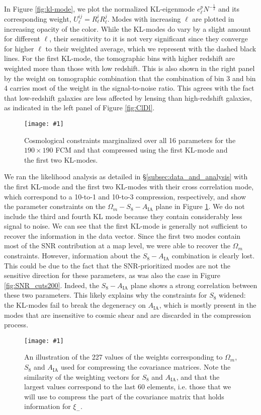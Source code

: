 \documentclass[aps, prd, twocolumn, superscriptaddress, nofootinbib, amssymb, amsmath]{revtex4-2}
\newcommand{\sfig}[2]{
	\texttt{[image: \#1]}
}
\newcommand{\Sfig}[3]{
	\begin{figure}[#1]
		\sfig{../figures/#2.pdf}{\columnwidth}
		\caption{#3}
		\label{fig:#2}
	\end{figure}
}
\newcommand{\Swide}[3]{
	\begin{figure*}[#1]
		\sfig{../figures/#2.pdf}{\textwidth}
		\caption{#3}
		\label{fig:#2}
	\end{figure*}
}
\newcommand{\rf}[1]{Figure \ref{fig:#1}}
\newcommand{\rssec}[1]{\S\ref{subsec:#1}}
\begin{document}
In \rf{kl-mode}, we plot the normalized KL-eigenmode $e^p_{\ell} N^{-\frac{1}{2}}$ and its corresponding weight, $U^{ij}_\ell=R_\ell^i R_\ell^j$. Modes with increasing $\ell$ are plotted in increasing opacity of the color. While the KL-modes do vary by a slight amount for different $\ell$, their sensitivity to it is not very significant since they converge for higher $\ell$ to their weighted average, which we represent with the dashed black lines. For the first KL-mode, the tomographic bins with higher redshift are weighted more than those with low redshift. This is also shown in the right panel by the weight on tomographic combination that the combination of bin 3 and bin 4 carries most of the weight in the signal-to-noise ratio. This agrees with the fact that low-redshift galaxies are less affected by lensing than high-redshift galaxies, as indicated in the left panel of \rf{ClDl}.

\Sfig{b}{CompKL-constraints_wmS8A}{Cosmological constraints marginalized over all 16 parameters for the  $190 \times 190$ FCM and that compressed using the first KL-mode and the first two KL-modes.}

We ran the likelihood analysis as detailed in \rssec{data_and_analysis} with the first KL-mode and the first two KL-modes with their cross correlation mode, which correspond to a 10-to-1 and 10-to-3 compression, respectively, and show the parameter constraints on the $\Omega_m - S_8 - A_{\text{IA}}$ plane in \rf{CompKL-constraints_wmS8A}. We do not include the third and fourth KL mode because they contain considerably less signal to noise. We can see that the first KL-mode is generally not sufficient to recover the information in the data vector. Since the first two modes contain most of the SNR contribution at a map level, we were able to recover the $\Omega_m$ constraints. However, information about the $S_8-A_{\text{IA}}$ combination is clearly lost. This could be due to the fact that the SNR-prioritized modes are not the sensitive direction for these parameters, as was also the case in \rf{SNR_cuts200}. Indeed, the $S_8 - A_{\text{IA}}$ plane shows a strong correlation between these two parameters. This likely explains why the constraints for $S_8$ widened: the KL-modes fail to break the degeneracy on $A_{\text{IA}}$, which is mostly present in the modes that are insensitive to cosmic shear and are discarded in the compression process.

\Swide{tbp}{Weights_2pt}{An illustration of the 227 values of the weights corresponding to $\Omega_m$, $S_8$ and $A_{\text{IA}}$ used for compressing the covariance matrices. Note the similarity of the weighting vectors for $S_8$ and $A_{\text{IA}}$, and that the largest values correspond to the last 60 elements, i.e. those that we will use to compress the part of the covariance matrix that holds information for $\xi_-$.}
\end{document}
